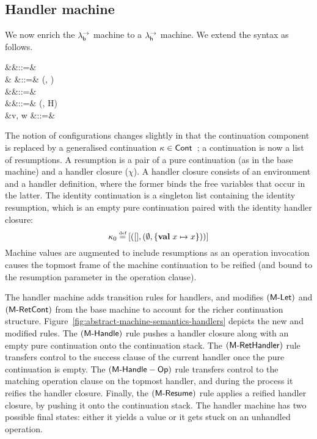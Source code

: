 \documentclass[12pt,phd,lfcs,twoside,openright,logo,leftchapter,normalheadings]{infthesis}
\theoremstyle{plain}
\theoremstyle{definition}
\begin{document}
\subsection{Handler machine}
\newcommand{\HClosure}{\dec{HClo}}
We now enrich the $\lambda^\rightarrow_{\mathsf{b}}$ machine to a $\lambda^\rightarrow_{\mathsf{h}}$ machine.
%
We extend the syntax as follows.
%
{
\begin{syntax}
              &\conf \in \Conf &::=& \\
                 &\rho \in {} &::=& (\sigma, \chi)\\
               &\kappa \in \Cont &::=& \nil \mid \rho \cons \kappa\\
            &\chi \in \HClosure   &::=& (\env, H) \\
              &v, w \in \MVal  &::=& \cdots \mid \rho \\
\end{syntax}}%
%
The notion of configurations changes slightly in that the continuation
component is replaced by a generalised continuation
$\kappa \in \mathsf{Cont}$~\cite{HillerstromLA20}; a continuation is now a
list of resumptions. A resumption is a pair of a pure continuation (as
in the base machine) and a handler closure ($\chi$).
%
A handler closure consists of an environment and a handler definition,
where the former binds the free variables that occur in the latter.
%
The identity continuation is a singleton list containing the identity
resumption, which is an empty pure continuation paired with the
identity handler closure:
%
{
\[
\kappa_0 \defas [(\nil, (\emptyset, \{\Val\;x \mapsto x\}))]
\]}%
%
Machine values are augmented to include resumptions as an operation
invocation causes the topmost frame of the machine continuation to be
reified (and bound to the resumption parameter in the operation
clause).
%

The handler machine adds transition rules for handlers, and modifies
$(\mathsf{M\textrm{-}Let})$ and $(\mathsf{M\textrm{-}RetCont})$ from the base machine to account
for the richer continuation
structure. Figure~\ref{fig:abstract-machine-semantics-handlers}
depicts the new and modified rules.
%
The $(\mathsf{M\textrm{-}Handle})$ rule pushes a handler closure along with an
empty pure continuation onto the continuation stack.
%
The $(\mathsf{M\textrm{-}RetHandler})$ rule transfers control to the success clause
of the current handler once the pure continuation is empty.
%
The $(\mathsf{M\textrm{-}Handle-Op})$ rule transfers control to the matching
operation clause on the topmost handler, and during the process it
reifies the handler closure. Finally, the $(\mathsf{M\textrm{-}Resume})$ rule
applies a reified handler closure, by pushing it onto the continuation
stack.
%
The handler machine has two possible final states: either it yields a
value or it gets stuck on an unhandled operation.
\end{document}
